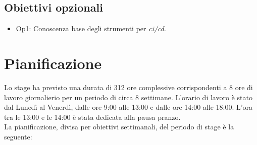 \subsection{Obiettivi opzionali}
\begin{itemize}
    \item Op1: Conoscenza base degli strumenti per \textit{\gls{ci}\glsfirstoccur{}/\gls{cd}\glsfirstoccur{}}.
\end{itemize}

\section{Pianificazione}
Lo stage ha previsto una durata di 312 ore complessive corrispondenti a 8 ore di lavoro giornalierio per un periodo di circa 8 settimane. L'orario di lavoro è stato dal Lunedì al Venerdì, dalle ore 9:00 alle 13:00 e dalle ore 14:00 alle 18:00. L'ora tra le 13:00 e le 14:00 è stata dedicata alla pausa pranzo.
\\La pianificazione, divisa per obiettivi settimanali, del periodo di stage è la seguente:
